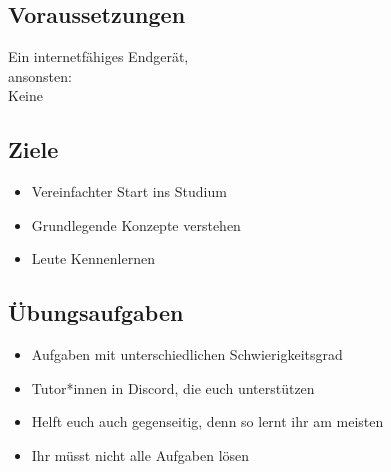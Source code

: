 \subsection{Voraussetzungen}
\begin{frame}
	\slidehead
	\centering
	\vspace{1.5cm}
	\tiny Ein internetfähiges Endgerät,\\ansonsten:\\
	\Huge Keine
\end{frame}

\subsection{Ziele}
\begin{frame}
	\slidehead
	\begin{itemize}
		\item Vereinfachter Start ins Studium
		\item Grundlegende Konzepte verstehen
		\item Leute Kennenlernen

	\end{itemize}
\end{frame}

\subsection{Übungsaufgaben}
\begin{frame}
	\slidehead
	\begin{itemize}
		\item Aufgaben mit unterschiedlichen Schwierigkeitsgrad
		\item Tutor*innen in Discord, die euch unterstützen
		\item Helft euch auch gegenseitig, denn so lernt ihr am meisten
		\item Ihr müsst nicht alle Aufgaben lösen
	\end{itemize}
\end{frame}

